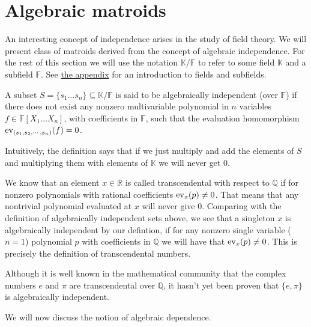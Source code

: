 \section{Algebraic matroids}\label{sec:algebraic-matroids}

An interesting concept of independence arises in the study of field theory. We will present class of matroids derived from the concept of algebraic independence. For the rest of this section we will use the notation $\mathbb K / \mathbb F$ to refer to some field $\mathbb K$ and a subfield $\mathbb F$. See \hyperref[sec:appendix-fields]{the appendix} for an introduction to fields and subfields.

\begin{defn}
	A subset $S = \{ s_1 \ldots s _n \} \subseteq \mathbb K / \mathbb F$ is said to be algebraically independent (over $\mathbb F$) if there does not exist any
	nonzero multivariable polynomial in $n$ variables $f \in \mathbb{F}[X _1 \ldots X _n]$, with coefficients in $\mathbb{F} $, such that the evaluation homomorphism $\mathrm{ev}_{(s_1, s_2,\cdots,s_n)}(f) = 0$.
\end{defn}
Intuitively, the definition says that if we just multiply and add the elements of $S$ and multiplying them with elements of $\mathbb{K}$ we will never get 0.



We know that an element $x\in \mathbb{R}$ is called transcendental with respect to $\mathbb{Q}$ if for nonzero polynomials with rational coefficients $\mathrm{ev}_{x}(p) \neq 0$. That means that any nontrivial polynomial evaluated at $x$ will never give 0.
Comparing with the definition of algebraically independent sets above, we see that a singleton ${x}$ is algebraically independent by our defintion, if for any nonzero  single variable ($n = 1$) polynomial $p$ with coefficients in $\mathbb{Q}$ we will have that $\mathrm{ev}_{x}(p) \neq 0$. This is precisely the definition of transcendental numbers.

Although it is well known in the mathematical community that the complex numbers $e$ and $\pi$ are transcendental over $\mathbb{Q}$, it hasn't yet been proven that $\{e, \pi \}$ is algebraically independent.

We will now discuss the notion of algebraic dependence.


